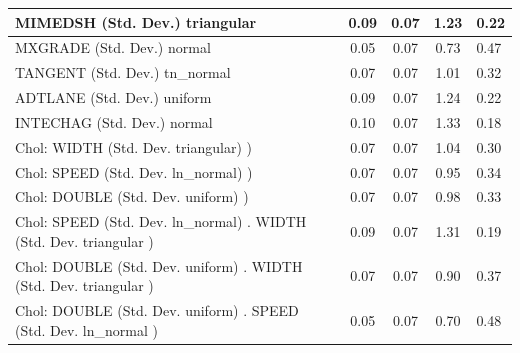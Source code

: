 \begin{table}
\begin{center}
\begin{tabular}{|l|l|c|c|c|l|}
			\hline
			MIMEDSH (Std. Dev.) triangular &  & 0.09 & 0.07 & 1.23 & 0.22 \\
			\hline
			MXGRADE (Std. Dev.) normal &  & 0.05 & 0.07 & 0.73 & 0.47 \\
			\hline
			TANGENT (Std. Dev.) tn_normal &  & 0.07 & 0.07 & 1.01 & 0.32 \\
			\hline
			ADTLANE (Std. Dev.) uniform &  & 0.09 & 0.07 & 1.24 & 0.22 \\
			\hline
			INTECHAG (Std. Dev.) normal &  & 0.10 & 0.07 & 1.33 & 0.18 \\
			\hline
			 Chol: WIDTH (Std. Dev. triangular) ) &  & 0.07 & 0.07 & 1.04 & 0.30 \\
			\hline
			 Chol: SPEED (Std. Dev. ln_normal) ) &  & 0.07 & 0.07 & 0.95 & 0.34 \\
			\hline
			 Chol: DOUBLE (Std. Dev. uniform) ) &  & 0.07 & 0.07 & 0.98 & 0.33 \\
			\hline
			 Chol: SPEED (Std. Dev. ln_normal) . WIDTH (Std. Dev.   triangular ) &  & 0.09 & 0.07 & 1.31 & 0.19 \\
			\hline
			 Chol: DOUBLE (Std. Dev. uniform) . WIDTH (Std. Dev.   triangular ) &  & 0.07 & 0.07 & 0.90 & 0.37 \\
			\hline
			 Chol: DOUBLE (Std. Dev. uniform) . SPEED (Std. Dev.   ln_normal ) &  & 0.05 & 0.07 & 0.70 & 0.48 \\
			\hline
		\end{tabular}
	\end{center}
\end{table}